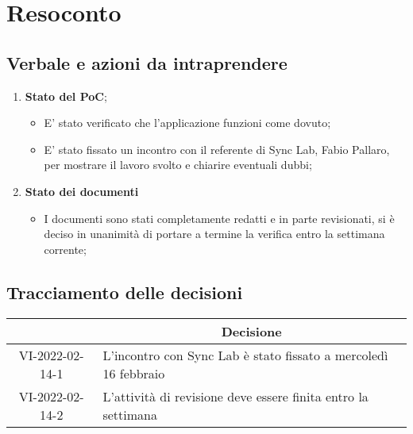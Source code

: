 \section{Resoconto}
\subsection{Verbale e azioni da intraprendere}

\begin{enumerate}
	\item \textbf{Stato del PoC};
	\begin{itemize}
		\item E' stato verificato che l'applicazione funzioni come dovuto;
		\item E' stato fissato un incontro con il referente di Sync Lab, Fabio Pallaro, per mostrare il lavoro svolto e chiarire eventuali dubbi;
	\end{itemize}
	\item \textbf{Stato dei documenti}
	\begin{itemize}
		\item I documenti sono stati completamente redatti e in parte revisionati, si è deciso in unanimità di portare a termine la verifica entro la settimana corrente;
	\end{itemize}
\end{enumerate}

\pagebreak

\subsection{Tracciamento delle decisioni}

\begin{table}[H]
	\centering
	\renewcommand{\arraystretch}{1.8}
	\begin{tabular}{c | p{10cm}}
		\rowcolor[HTML]{125E28}
		\multicolumn{1}{c}{\color[HTML]{FFFFFF} \textbf{ID}} &
		\multicolumn{1}{c}{\color[HTML]{FFFFFF} \textbf{Decisione}} \\
		\hline
		VI-2022-02-14-1 & L'incontro con Sync Lab è stato fissato a mercoledì 16 febbraio \\ \hline
		VI-2022-02-14-2 & L'attività di revisione deve essere finita entro la settimana \\
	\end{tabular}
\end{table}